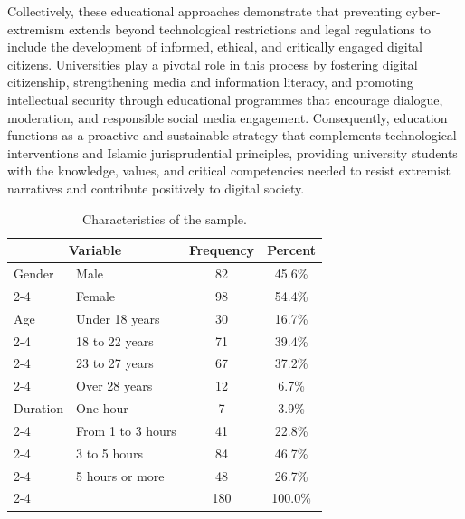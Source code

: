 \documentclass[10pt]{NSP1}
\begin{document}
	Collectively, these educational approaches demonstrate that preventing cyber-extremism extends beyond technological restrictions and legal regulations to include the development of informed, ethical, and critically engaged digital citizens. Universities play a pivotal role in this process by fostering digital citizenship, strengthening media and information literacy, and promoting intellectual security through educational programmes that encourage dialogue, moderation, and responsible social media engagement. Consequently, education functions as a proactive and sustainable strategy that complements technological interventions and Islamic jurisprudential principles, providing university students with the knowledge, values, and critical competencies needed to resist extremist narratives and contribute positively to digital society.
	
	\setcounter{table}{0}
\begin{table}[H]
	\centering
	\caption{Characteristics of the sample.}
	\small
	\renewcommand{\arraystretch}{1.3}
	\begin{tabular}{|l|l|c|c|}
		\hline
		\multicolumn{2}{|c|}{\textbf{Variable}} & \textbf{Frequency} & \textbf{Percent} \\
		\hline
		Gender & Male & 82 & 45.6\% \\
		\cline{2-4}
		& Female & 98 & 54.4\% \\
		\hline
		Age & Under 18 years & 30 & 16.7\% \\
		\cline{2-4}
		& 18 to 22 years & 71 & 39.4\% \\
		\cline{2-4}
		& 23 to 27 years & 67 & 37.2\% \\
		\cline{2-4}
		& Over 28 years & 12 & 6.7\% \\
		\hline
		Duration & One hour & 7 & 3.9\% \\
		\cline{2-4}
		& From 1 to 3 hours & 41 & 22.8\% \\
		\cline{2-4}
		& 3 to 5 hours & 84 & 46.7\% \\
		\cline{2-4}
		& 5 hours or more & 48 & 26.7\% \\
		\cline{2-4}
		& & 180 & 100.0\% \\
		\hline
	\end{tabular}
\end{table}
	
\end{document}
